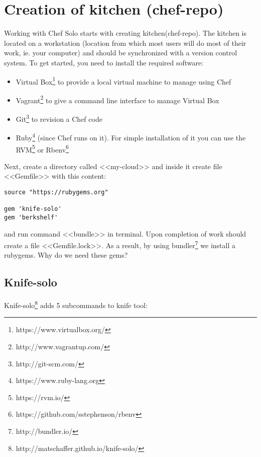 \section{Creation of kitchen (chef-repo)}

Working with Chef Solo starts with creating kitchen(chef-repo). The kitchen is located on a workstation (location from which most users will do most of their work, ie. your computer) and should be synchronized with a version control system. To get started, you need to install the required software:

\begin{itemize}
  \item Virtual Box\footnote{https://www.virtualbox.org/} to provide a local virtual machine to manage using Chef
  \item Vagrant\footnote{http://www.vagrantup.com/} to give a command line interface to manage Virtual Box
  \item Git\footnote{http://git-scm.com/} to revision a Chef code
  \item Ruby\footnote{https://www.ruby-lang.org} (since Chef runs on it). For simple installation of it you can use the RVM\footnote{https://rvm.io/} or Rbenv\footnote{https://github.com/sstephenson/rbenv}
\end{itemize}

Next, create a directory called <<my-cloud>> and inside it create file <<Gemfile>> with this content:

\begin{lstlisting}[label=lst:my-cloud-kitchen1,title=my-cloud/Gemfile]
source "https://rubygems.org"

gem 'knife-solo'
gem 'berkshelf'
\end{lstlisting}

and run command <<bundle>> in terminal. Upon completion of work should create a file <<Gemfile.lock>>. As a result, by using bundler\footnote{http://bundler.io/} we install a rubygems. Why do we need these gems?

\subsection{Knife-solo}

Knife-solo\footnote{http://matschaffer.github.io/knife-solo/} adds 5 subcommands to knife tool:


